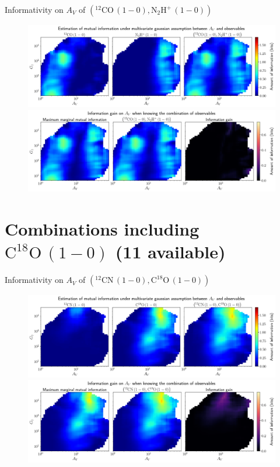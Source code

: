 \documentclass{beamer}
\begin{document}
\begin{frame}{Informativity on $A_V$ of $\left(\mathrm{^{12}CO\,(1-0)},\mathrm{N_2H^+\,(1-0)}\right)$}
    \begin{figure}
        \centering
        \includegraphics[width=0.95\linewidth]{../linearinfo/av__12co10_n2hp10_linearinfo.png}
        \vfill
        \includegraphics[width=0.95\linewidth]{../linearinfo/av__12co10_n2hp10_linearinfo_gain.png}
    \end{figure}
\end{frame}

\section{Combinations including $\mathrm{C^{18}O\,(1-0)}$ (11 available)}

\begin{frame}{Informativity on $A_V$ of $\left(\mathrm{^{12}CN\,(1-0)},\mathrm{C^{18}O\,(1-0)}\right)$}
    \begin{figure}
        \centering
        \includegraphics[width=0.95\linewidth]{../linearinfo/av__12cn10_c18o10_linearinfo.png}
        \vfill
        \includegraphics[width=0.95\linewidth]{../linearinfo/av__12cn10_c18o10_linearinfo_gain.png}
    \end{figure}
\end{frame}
\end{document}
